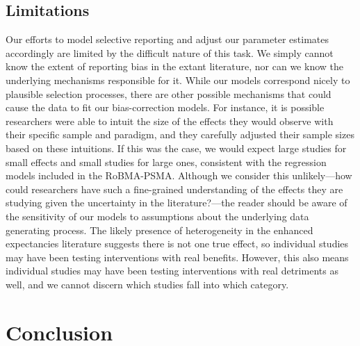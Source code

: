 \documentclass[
  man, donotrepeattitle,floatsintext]{apa7}
\begin{document}
\hypertarget{limitations}{%
\subsection{Limitations}\label{limitations}}

Our efforts to model selective reporting and adjust our parameter estimates accordingly are limited by the difficult nature of this task. We simply cannot know the extent of reporting bias in the extant literature, nor can we know the underlying mechanisms responsible for it. While our models correspond nicely to plausible selection processes, there are other possible mechanisms that could cause the data to fit our bias-correction models. For instance, it is possible researchers were able to intuit the size of the effects they would observe with their specific sample and paradigm, and they carefully adjusted their sample sizes based on these intuitions. If this was the case, we would expect large studies for small effects and small studies for large ones, consistent with the regression models included in the RoBMA-PSMA. Although we consider this unlikely---how could researchers have such a fine-grained understanding of the effects they are studying given the uncertainty in the literature?---the reader should be aware of the sensitivity of our models to assumptions about the underlying data generating process. The likely presence of heterogeneity in the enhanced expectancies literature suggests there is not one true effect, so individual studies may have been testing interventions with real benefits. However, this also means individual studies may have been testing interventions with real detriments as well, and we cannot discern which studies fall into which category.

\hypertarget{conclusion}{%
\section{Conclusion}\label{conclusion}}
\end{document}

